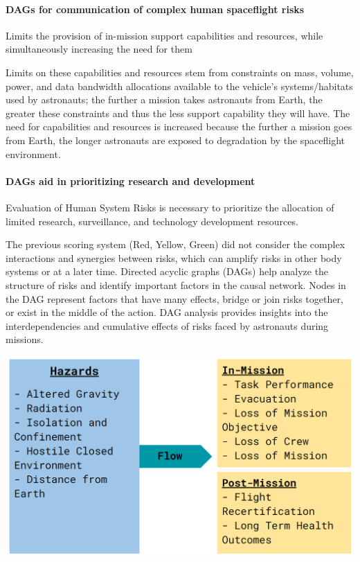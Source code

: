\documentclass{article}
\begin{document}
\paragraph{DAGs for communication of complex human spaceflight risks}
Limits the provision of in-mission support capabilities and resources, while simultaneously increasing the need for them

Limits on these capabilities and resources stem from constraints on mass, volume, power, and data bandwidth allocations available to the vehicle’s systems/habitats used by astronauts; the further a mission takes astronauts from Earth, the greater these constraints and thus the less support capability they will have. 
The need for capabilities and resources is increased because the further a mission goes from Earth, the longer astronauts are exposed to degradation by the spaceflight environment.

\paragraph{DAGs aid in prioritizing research and development}
Evaluation of Human System Risks is necessary to prioritize the allocation of limited research, surveillance, and technology development resources.

The previous scoring system (Red, Yellow, Green) did not consider the complex interactions and synergies between risks, which can amplify risks in other body systems or at a later time.
Directed acyclic graphs (DAGs) help analyze the structure of risks and identify important factors in the causal network.
Nodes in the DAG represent factors that have many effects, bridge or join risks together, or exist in the middle of the action.
DAG analysis provides insights into the interdependencies and cumulative effects of risks faced by astronauts during missions.

\includegraphics[width=\textwidth,height=\textheight,keepaspectratio]{flow.png}
\end{document}
